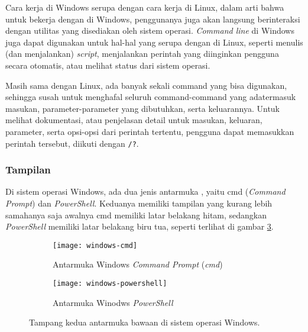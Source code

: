 Cara kerja \cl di Windows serupa dengan cara kerja \cl di Linux, dalam arti bahwa untuk bekerja dengan \cl di Windows, penggunanya juga akan langsung berinteraksi dengan utilitas yang disediakan oleh sistem operasi. \textit{Command line} di Windows juga dapat digunakan untuk hal-hal yang serupa dengan \cl di Linux, seperti menulis (dan menjalankan) \textit{script}, menjalankan perintah yang diinginkan pengguna secara otomatis, atau melihat status dari sistem operasi.\cite{mueller:2007:windowscommandline}

Masih sama dengan Linux, ada banyak sekali command yang bisa digunakan, sehingga susah untuk menghafal seluruh command-command yang ada\textemdash termasuk masukan, parameter-parameter yang dibutuhkan, serta keluarannya. Untuk melihat dokumentasi, atau penjelasan detail untuk masukan, keluaran, parameter, serta opsi-opsi dari perintah tertentu, pengguna dapat memasukkan perintah tersebut, diikuti dengan \verb|/?|.\cite{mueller:2007:windowscommandline}

\subsubsection{Tampilan}
\label{sec:commandline-windows-appearance}

Di sistem operasi Windows, ada dua jenis antarmuka \cl, yaitu cmd (\textit{Command Prompt}) dan \textit{PowerShell}. Keduanya memiliki tampilan yang kurang lebih sama\textemdash hanya saja awalnya cmd memiliki latar belakang hitam, sedangkan \textit{PowerShell} memiliki latar belakang biru tua, seperti terlihat di gambar \ref{fig:commandline-windows-programs}.

\begin{figure}[ht]
    \begin{subfigure}[b]{0.49\linewidth}
		\centering
		\texttt{[image: windows-cmd]}
		\caption{Antarmuka Windows \textit{Command Prompt} (\textit{cmd})}
		\label{fig:commandline-windows-cmd}
	\end{subfigure}
	\hfill
    \begin{subfigure}[b]{0.49\linewidth}
		\centering
		\texttt{[image: windows-powershell]}
		\caption{Antarmuka Winodws \textit{PowerShell}}
		\label{fig:commandline-windows-powershell}
	\end{subfigure}
    \caption{Tampang kedua antarmuka \cl bawaan di sistem operasi Windows.}
	\label{fig:commandline-windows-programs}
\end{figure}

